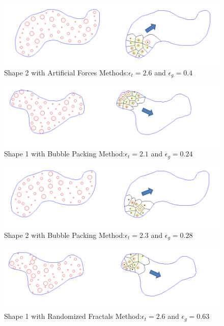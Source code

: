 \begin{figure}[H]
\caption{Shape 2 with Artificial Forces Methods:$\epsilon_t = 2.6$ and $\epsilon_g = 0.4$}
\centerline{\includegraphics[scale = 0.65]{Artificial_Forces_Mesh_2}}
\end{figure} 		
		
\begin{figure}[H]
\caption{Shape 1 with Bubble Packing Method:$\epsilon_t = 2.1$ and $\epsilon_g = 0.24$}
\centerline{\includegraphics[scale = 0.70]{Bubble_Packing_Mesh_1}}
\end{figure} 	
				
\begin{figure}[H]
\caption{Shape 2 with Bubble Packing Method:$\epsilon_t = 2.3$ and $\epsilon_g = 0.28$}
\centerline{\includegraphics[scale = 0.65]{Bubble_Packing_Mesh_2}}
\end{figure} 			
						
\begin{figure}[H]
\caption{Shape 1 with Randomized Fractals Method:$\epsilon_t = 2.6$ and $\epsilon_g = 0.63$}
\centerline{\includegraphics[scale = 0.70]{Randomized_Fractals_Mesh_1}}
\end{figure} 	

